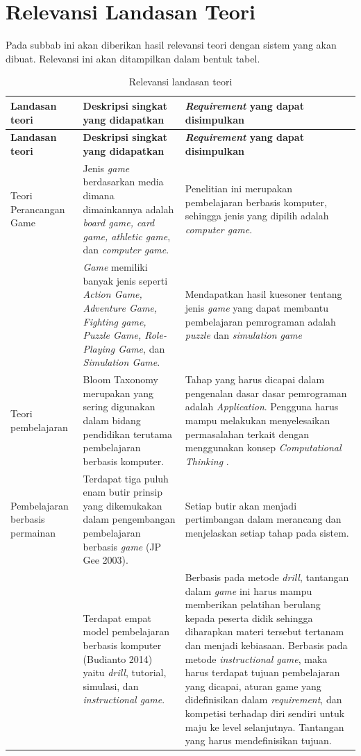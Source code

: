 \section{Relevansi Landasan Teori}
Pada subbab ini akan diberikan hasil relevansi teori dengan sistem yang akan dibuat. Relevansi ini akan ditampilkan dalam bentuk tabel.
\begin{longtable}{| p{2cm} | p{5cm} | p{5cm} |}
	\caption{Relevansi landasan teori} \\
	\hline
	\textbf{Landasan teori} & \textbf{Deskripsi singkat yang didapatkan} & \textbf{\textit{Requirement} yang dapat disimpulkan} \\
	\hline
	\endfirsthead
		\hline
		\textbf{Landasan teori} & \textbf{Deskripsi singkat yang didapatkan} & \textbf{\textit{Requirement} yang dapat disimpulkan} \\
		\hline
		\endhead
		Teori Perancangan Game & Jenis \textit{game} berdasarkan media dimana dimainkannya adalah \textit{board game, card game, athletic game}, dan \textit{computer game}. & Penelitian ini merupakan pembelajaran berbasis komputer, sehingga jenis yang dipilih adalah \textit{computer game}. \\
		\hline
		& \textit{Game} memiliki banyak jenis seperti \textit{Action Game, Adventure Game, Fighting game, Puzzle Game, Role-Playing Game}, dan \textit{Simulation Game}. & Mendapatkan hasil kuesoner tentang jenis \textit{game} yang dapat membantu pembelajaran pemrograman adalah \textit{puzzle} dan \textit{simulation game}\\
		\hline
		Teori pembelajaran & Bloom Taxonomy merupakan yang sering digunakan dalam bidang pendidikan terutama pembelajaran berbasis komputer. & Tahap yang harus dicapai dalam pengenalan dasar dasar pemrograman adalah \textit{Application}. Pengguna harus mampu melakukan menyelesaikan permasalahan terkait dengan menggunakan konsep \textit{Computational Thinking }. \\
		\hline
		Pembelajaran berbasis permainan & Terdapat tiga puluh enam butir prinsip yang dikemukakan dalam pengembangan pembelajaran berbasis \textit{game} (JP Gee 2003). & Setiap butir akan menjadi pertimbangan dalam merancang dan menjelaskan setiap tahap pada sistem. \\
		\hline
		& Terdapat empat model pembelajaran berbasis komputer (Budianto 2014) yaitu \textit{drill}, tutorial, simulasi, dan \textit{instructional game}. & Berbasis pada metode \textit{drill}, tantangan dalam  \textit{game} ini harus mampu memberikan pelatihan berulang kepada peserta didik sehingga diharapkan materi tersebut tertanam dan menjadi kebiasaan. Berbasis pada metode \textit{instructional game}, maka harus terdapat tujuan pembelajaran yang dicapai, aturan game yang didefinisikan dalam \textit{requirement}, dan kompetisi terhadap diri sendiri untuk maju ke level selanjutnya. Tantangan yang harus mendefinisikan tujuan. \\

\end{longtable}
